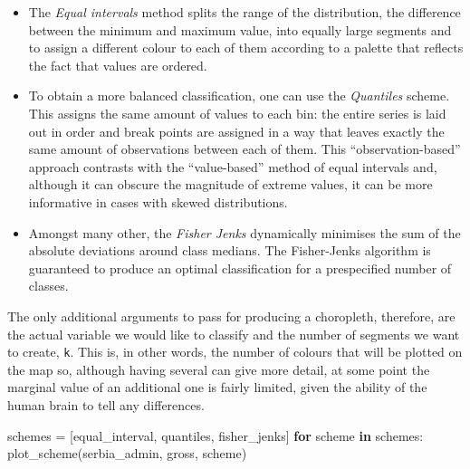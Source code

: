 \documentclass[
  letterpaper,
  DIV=11,
  numbers=noendperiod]{scrreprt}
\newenvironment{Shaded}{\begin{snugshade}}{\end{snugshade}}
\newcommand{\ControlFlowTok}[1]{\textcolor[rgb]{0.00,0.23,0.31}{\textbf{#1}}}
\newcommand{\KeywordTok}[1]{\textcolor[rgb]{0.00,0.23,0.31}{\textbf{#1}}}
\newcommand{\NormalTok}[1]{\textcolor[rgb]{0.00,0.23,0.31}{#1}}
\newcommand{\OperatorTok}[1]{\textcolor[rgb]{0.37,0.37,0.37}{#1}}
\newcommand{\StringTok}[1]{\textcolor[rgb]{0.13,0.47,0.30}{#1}}
\providecommand{\tightlist}{%
  \setlength{\itemsep}{0pt}\setlength{\parskip}{0pt}}\usepackage{longtable,booktabs,array}
\begin{document}
\begin{itemize}
\tightlist
\item
  The \emph{Equal intervals} method splits the range of the
  distribution, the difference between the minimum and maximum value,
  into equally large segments and to assign a different colour to each
  of them according to a palette that reflects the fact that values are
  ordered.
\item
  To obtain a more balanced classification, one can use the
  \emph{Quantiles} scheme. This assigns the same amount of values to
  each bin: the entire series is laid out in order and break points are
  assigned in a way that leaves exactly the same amount of observations
  between each of them. This ``observation-based'' approach contrasts
  with the ``value-based'' method of equal intervals and, although it
  can obscure the magnitude of extreme values, it can be more
  informative in cases with skewed distributions.
\item
  Amongst many other, the \emph{Fisher Jenks} dynamically minimises the
  sum of the absolute deviations around class medians. The Fisher-Jenks
  algorithm is guaranteed to produce an optimal classification for a
  prespecified number of classes.
\end{itemize}

The only additional arguments to pass for producing a choropleth,
therefore, are the actual variable we would like to classify and the
number of segments we want to create, \texttt{k}. This is, in other
words, the number of colours that will be plotted on the map so,
although having several can give more detail, at some point the marginal
value of an additional one is fairly limited, given the ability of the
human brain to tell any differences.

\begin{Shaded}
\begin{Highlighting}[]
\NormalTok{schemes }\OperatorTok{=}\NormalTok{ [}\StringTok{\textquotesingle{}equal\_interval\textquotesingle{}}\NormalTok{, }\StringTok{\textquotesingle{}quantiles\textquotesingle{}}\NormalTok{, }\StringTok{\textquotesingle{}fisher\_jenks\textquotesingle{}}\NormalTok{]}
\ControlFlowTok{for}\NormalTok{ scheme }\KeywordTok{in}\NormalTok{ schemes:}
\NormalTok{    plot\_scheme(serbia\_admin, }\StringTok{\textquotesingle{}gross\textquotesingle{}}\NormalTok{, scheme)}
\end{Highlighting}
\end{Shaded}
\end{document}
